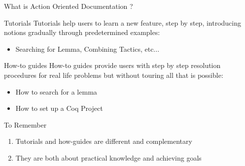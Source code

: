 \documentclass[10pt]{beamer}
\begin{document}
\begin{frame}{What is Action Oriented Documentation ?}
  \vspace*{-4pt}
  \begin{tcbProp}{Tutorials}
    Tutorials help users to learn a new feature, step by step, introducing
    notions gradually through predetermined examples:
    \begin{itemize}[label=$\hookrightarrow$]
      \item<1-> Searching for Lemma, Combining Tactics, etc...
    \end{itemize}
  \end{tcbProp}
  \vspace*{-4pt}
  \begin{tcbProp}{How-to guides}
    How-to guides provide users with step by step resolution procedures for real
    life problems but without touring all that is possible:
    \begin{itemize}[label=$\hookrightarrow$]
      \item<2-> How to search for a lemma
      \item<2-> How to set up a Coq Project
    \end{itemize}
  \end{tcbProp}
  \vspace*{-4pt}
  \begin{tcbSol}{To Remember}
    \begin{enumerate}
      \item<3-> Tutorials and how-guides are different and complementary
      \item<4-> They are both about practical knowledge and achieving goals
    \end{enumerate}
  \end{tcbSol}
\end{frame}
\end{document}
